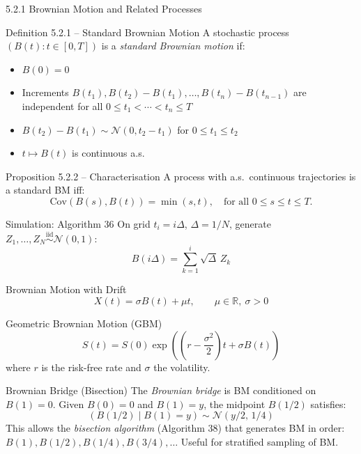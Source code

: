 \documentclass[aspectratio=169,10pt]{beamer}
\begin{document}
\begin{frame}[allowframebreaks]{5.2.1 Brownian Motion and Related Processes}

  \begin{block}{Definition 5.2.1 -- Standard Brownian Motion}
    A stochastic process $(B(t): t \in [0,T])$ is a \emph{standard Brownian motion} if:
    \begin{itemize}
      \item[(i)] $B(0) = 0$
      \item[(ii)] Increments $B(t_1), B(t_2)-B(t_1), \ldots, B(t_n)-B(t_{n-1})$
                 are independent for all $0 \le t_1 < \cdots < t_n \le T$
      \item[(iii)] $B(t_2) - B(t_1) \sim \mathcal{N}(0, t_2-t_1)$ for $0 \le t_1 \le t_2$
      \item[(iv)] $t \mapsto B(t)$ is continuous a.s.
    \end{itemize}
  \end{block}

  \begin{block}{Proposition 5.2.2 -- Characterisation}
    A process with a.s.\ continuous trajectories is a standard BM iff:
    \[
      \mathrm{Cov}(B(s), B(t)) = \min(s, t), \quad \text{for all } 0 \le s \le t \le T.
    \]
  \end{block}

  \framebreak

  \begin{block}{Simulation: Algorithm 36}
    On grid $t_i = i\Delta$, $\Delta = 1/N$, generate
    $Z_1, \ldots, Z_N \overset{\text{iid}}{\sim} \mathcal{N}(0,1)$:
    \[
      B(i\Delta) = \sum_{k=1}^i \sqrt{\Delta}\, Z_k
    \]
  \end{block}

  \begin{block}{Brownian Motion with Drift}
    \[
      X(t) = \sigma B(t) + \mu t, \qquad \mu \in \mathbb{R},\ \sigma > 0
    \]
  \end{block}

  \begin{block}{Geometric Brownian Motion (GBM)}
    \[
      S(t) = S(0)\exp\!\left(\left(r - \frac{\sigma^2}{2}\right)t + \sigma B(t)\right)
    \]
    where $r$ is the risk-free rate and $\sigma$ the volatility.
  \end{block}

  \framebreak

  \begin{block}{Brownian Bridge (Bisection)}
    The \emph{Brownian bridge} is BM conditioned on $B(1)=0$.
    Given $B(0)=0$ and $B(1)=y$, the midpoint $B(1/2)$ satisfies:
    \[
      (B(1/2) \mid B(1) = y) \sim \mathcal{N}(y/2,\, 1/4)
    \]
    This allows the \emph{bisection algorithm} (Algorithm 38) that generates
    BM in order: $B(1), B(1/2), B(1/4), B(3/4), \ldots$
    Useful for stratified sampling of BM.
  \end{block}

\end{frame}
\end{document}
